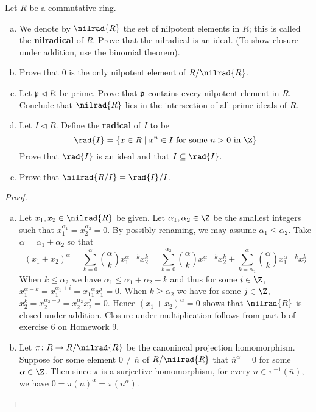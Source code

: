 \documentclass[10pt]{amsart}
\begin{document}
\begin{thm}
  Let $R$ be a commutative ring.
  \begin{enumerate}[(a)]
  \item
    We denote by $\nilrad{R}$ the set of nilpotent elements in $R$; this is called the {\bf nilradical} of $R$.
    Prove that the nilradical is an ideal.
    (To show closure under addition, use the binomial theorem).
  \item
    Prove that $0$ is the only nilpotent element of $R/\nilrad{R}$.
  \item
    Let $\mathfrak{p} \lhd R$ be prime.
    Prove that $\mathfrak{p}$ contains every nilpotent element in $R$.
    Conclude that $\nilrad{R}$ lies in the intersection of all prime ideals of $R$.
  \item
    Let $I \lhd R$.
    Define the {\bf radical} of $I$ to be 
    $$\rad{I} = \left\{x \in R \;\middle\vert\; x^n \in I\ \text{for some}\ n > 0\ \text{in}\ \Z\right\}$$
    Prove that $\rad{I}$ is an ideal and that $I \subseteq \rad{I}.$
  \item
    Prove that $\nilrad{R/I} = \rad{I}/I$.
  \end{enumerate}
  \begin{proof}
    \begin{enumerate}[(a)]
    \item
      Let $x_1, x_2 \in \nilrad{R}$ be given.
      Let $\alpha_1, \alpha_2 \in \Z$ be the smallest integers such that $x_1^{\alpha_1} = x_2^{\alpha_2} = 0$.
      By possibly renaming, we may assume $\alpha_1 \leq \alpha_2$.
      Take $\alpha = \alpha_1 + \alpha_2$ so that 
      $$(x_1 + x_2)^\alpha = \sum_{k=0}^\alpha {\alpha \choose k} x_1^{\alpha-k}x_2^k = \sum_{k=0}^{\alpha_2} {\alpha \choose k} x_1^{\alpha - k}x_2^k + \sum_{k=\alpha_2}^\alpha {\alpha \choose k} x_1^{\alpha - k}x_2^k$$
      When $k \leq \alpha_2$ we have $\alpha_1 \leq \alpha_1 + \alpha_2 - k$ and thus for some $i \in \Z$, $x_1^{\alpha-k} = x_1^{\alpha_1 + i} = x_1{^\alpha_1}x_1^i = 0$.
      When $k \geq \alpha_2$ we have for some $j \in \Z$, $x_2^k = x_2^{\alpha_2 + j} = x_2^{\alpha_2}x_2^j = 0.$
      Hence $(x_1 + x_2)^\alpha = 0$ shows that $\nilrad{R}$ is closed under addition.
      Closure under multiplication follows from part b of exercise 6 on Homework 9.
    \item
      Let $\pi \colon R \rightarrow R/\nilrad{R}$ be the canonincal projection homomorphism.
      Suppose for some element $0 \neq \overline{n}$ of $R/\nilrad{R}$ that $\overline{n}^\alpha = 0$ for some $\alpha \in \Z$.
      Then since $\pi$ is a surjective homomorphism, for every $n \in \pi^{-1}(\overline{n})$, we have $0 = \pi(n)^\alpha = \pi(n^\alpha)$.

\end{enumerate}
\end{proof}
\end{thm}
\end{document}
